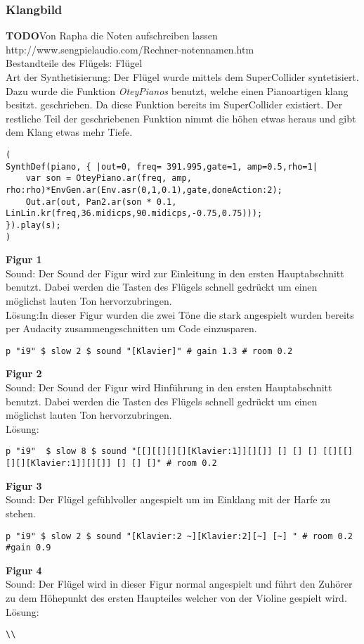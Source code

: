 \documentclass[
10pt, %
a4paper, %
oneside, %
headinclude,footinclude, %
BCOR5mm, %
]{scrartcl}
\begin{document}
\subsubsection{Klangbild}
{\color{red}\textbf{TODO}}Von Rapha die Noten aufschreiben lassen http://www.sengpielaudio.com/Rechner-notennamen.htm\\
Bestandteile des Flügels: Flügel\\
Art der Synthetisierung: Der Flügel wurde mittels dem SuperCollider syntetisiert. Dazu wurde die Funktion \textit{OteyPianos} benutzt, welche einen Pianoartigen klang besitzt. geschrieben. Da diese Funktion bereits im SuperCollider existiert. Der restliche Teil der geschriebenen Funktion nimmt die höhen etwas heraus und gibt dem Klang etwas mehr Tiefe.\\ 
\begin{lstlisting}
(
SynthDef(piano, { |out=0, freq= 391.995,gate=1, amp=0.5,rho=1|
    var son = OteyPiano.ar(freq, amp, rho:rho)*EnvGen.ar(Env.asr(0,1,0.1),gate,doneAction:2);
    Out.ar(out, Pan2.ar(son * 0.1, LinLin.kr(freq,36.midicps,90.midicps,-0.75,0.75)));
}).play(s);
)
\end{lstlisting}
\noindent \textbf{Figur 1}\\
Sound: Der Sound der Figur wird zur Einleitung in den ersten Hauptabschnitt benutzt. Dabei werden die Tasten des Flügels 
schnell gedrückt um einen möglichst lauten Ton hervorzubringen.\\
Lösung:In dieser Figur wurden die zwei Töne die stark angespielt wurden bereits per Audacity zusammengeschnitten um Code einzusparen.\\
\begin{lstlisting}
p "i9" $ slow 2 $ sound "[Klavier]" # gain 1.3 # room 0.2
\end{lstlisting}
\noindent \textbf{Figur 2}\\
Sound: Der Sound der Figur wird Hinführung in den ersten Hauptabschnitt benutzt. Dabei werden die Tasten des Flügels 
schnell gedrückt um einen möglichst lauten Ton hervorzubringen.\\
Lösung:\\
\begin{lstlisting}
p "i9"  $ slow 8 $ sound "[[][[][][][Klavier:1]][][]] [] [] [] [[][[][][][Klavier:1]][][]] [] [] []" # room 0.2 
\end{lstlisting}
\noindent \textbf{Figur 3}\\
Sound: Der Flügel gefühlvoller angespielt um im Einklang mit der Harfe zu stehen.
\begin{lstlisting}
p "i9" $ slow 2 $ sound "[Klavier:2 ~][Klavier:2][~] [~] " # room 0.2 #gain 0.9
\end{lstlisting}
\noindent \textbf{Figur 4}\\
Sound: Der Flügel wird in dieser Figur normal angespielt und führt den Zuhörer zu dem Höhepunkt des ersten Haupteiles welcher von der Violine gespielt wird.\\
Lösung:\\
\begin{lstlisting}
\\
\end{lstlisting}
\end{document}
